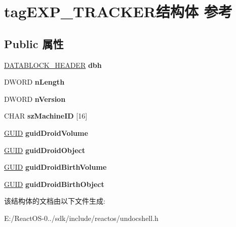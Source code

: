\hypertarget{structtag_e_x_p___t_r_a_c_k_e_r}{}\section{tag\+E\+X\+P\+\_\+\+T\+R\+A\+C\+K\+E\+R结构体 参考}
\label{structtag_e_x_p___t_r_a_c_k_e_r}
\subsection*{Public 属性}
\begin{DoxyCompactItemize}
\item 
\mbox{\label{structtag_e_x_p___t_r_a_c_k_e_r_a842b2fcedf31b13e12e080e0107e79a5}} 
\hyperlink{structtag_d_a_t_a_b_l_o_c_k_h_e_a_d_e_r}{D\+A\+T\+A\+B\+L\+O\+C\+K\+\_\+\+H\+E\+A\+D\+ER} {\bfseries dbh}
\item 
\mbox{\label{structtag_e_x_p___t_r_a_c_k_e_r_af9b8a891897c76daadad0cd5b349d6cd}} 
D\+W\+O\+RD {\bfseries n\+Length}
\item 
\mbox{\label{structtag_e_x_p___t_r_a_c_k_e_r_a406a64d0deb4347ec475308d41b0133f}} 
D\+W\+O\+RD {\bfseries n\+Version}
\item 
\mbox{\label{structtag_e_x_p___t_r_a_c_k_e_r_a09d5750c5d60094469ab466bbca25ff6}} 
C\+H\+AR {\bfseries sz\+Machine\+ID} \mbox{[}16\mbox{]}
\item 
\mbox{\label{structtag_e_x_p___t_r_a_c_k_e_r_ada99e1cc5e0f89a5815dbb774ea04f3d}} 
\hyperlink{interface_g_u_i_d}{G\+U\+ID} {\bfseries guid\+Droid\+Volume}
\item 
\mbox{\label{structtag_e_x_p___t_r_a_c_k_e_r_a0c9f2ed4b24a20694e3af91cd7b0386a}} 
\hyperlink{interface_g_u_i_d}{G\+U\+ID} {\bfseries guid\+Droid\+Object}
\item 
\mbox{\label{structtag_e_x_p___t_r_a_c_k_e_r_aaa696b9914e25f5b418bd6fc7b71248a}} 
\hyperlink{interface_g_u_i_d}{G\+U\+ID} {\bfseries guid\+Droid\+Birth\+Volume}
\item 
\mbox{\label{structtag_e_x_p___t_r_a_c_k_e_r_ae9bfd8287b94cd134c06d06a5d85cf77}} 
\hyperlink{interface_g_u_i_d}{G\+U\+ID} {\bfseries guid\+Droid\+Birth\+Object}
\end{DoxyCompactItemize}


该结构体的文档由以下文件生成\+:\begin{DoxyCompactItemize}
\item 
E\+:/\+React\+O\+S-\/0../sdk/include/reactos/undocshell.\+h\end{DoxyCompactItemize}
